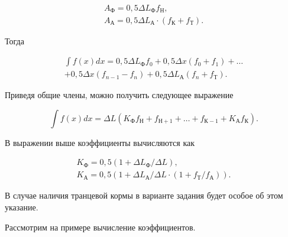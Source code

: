 \begin{equation}
    \begin{split}
    A_{\text{Ф}} = 0{,}5 \Delta L_{\text{Ф}} f_{\text{Н}}, \\
    A_{\text{А}} = 0{,}5 \Delta L_{\text{А}} \cdot (f_{\text{К}} + f_{\text{Т}}).
    \end{split}
\end{equation}

Тогда

\begin{equation}
    \begin{split}
    \int f(x) dx = 0{,}5 \Delta L_{\text{Ф}} f_0 + 0{,}5 \Delta x (f_0 + f_1) + \dots \\
    + 0{,}5 \Delta x (f_{n-1} - f_n) + 0{,}5 \Delta L_{\text{А}} (f_n + f_{\text{Т}}).
    \end{split}
\end{equation}

Приведя общие члены, можно получить следующее выражение

\begin{equation}
    \int f(x) dx = \Delta L (K_{\text{Ф}} f_{\text{Н}} + f_{\text{Н}+1} + \dots + f_{\text{К}-1} + K_{\text{А}} f_{\text{К}}).
\end{equation}

В выражении выше коэффициенты вычисляются как

\begin{equation}
    \begin{split}
    K_{\text{Ф}} = 0{,}5 (1 + \Delta L_{\text{Ф}}/ \Delta L), \\
    K_{\text{А}} = 0{,}5 (1 + \Delta L_{\text{А}} / \Delta L \cdot (1 + f_{\text{Т}} / f_{\text{А}})).
    \end{split}
\end{equation}

В случае наличия транцевой кормы в варианте задания будет особое об этом указание.

Рассмотрим на примере вычисление коэффициентов.

